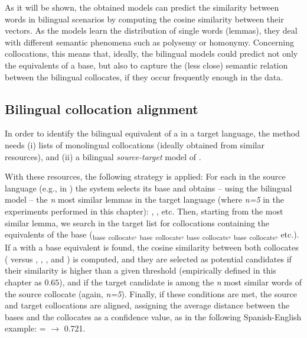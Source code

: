 \documentclass[output=paper
,modfonts
,nonflat]{langsci/langscibook}
\begin{document}
As it will be shown, the obtained models can predict the similarity between words
in bilingual scenarios by computing the cosine similarity between their vectors. As
the models learn the distribution of single words (lemmas), they deal with different
semantic phenomena such as polysemy or homonymy. Concerning collocations, this means
that, ideally, the bilingual models could predict not only the equivalents of a
base, but also to capture the (less close) semantic relation between the
bilingual collocates, if they occur frequently enough in the data.

%
\subsection{Bilingual collocation alignment}
\label{garcia:sec:align}
In order to identify the bilingual equivalent of a  in a target language,
the method needs (i) lists of monolingual collocations (ideally obtained from similar
resources), and (ii) a bilingual \emph{source-target} model of .

With these resources, the following strategy is applied: For each 
in the source language (e.g.,  in ) the system selects its base and obtains -- using the bilingual model --
the \emph{n} most similar lemmas in the target language (where \emph{n=5} in the experiments
performed in this chapter): , , etc. Then, starting from the most similar lemma,
we search in the target list for collocations containing the equivalents of
the base (\textsubscript{base} \textsubscript{collocate},
\textsubscript{base} \textsubscript{collocate}, \textsubscript{base} \textsubscript{collocate}, \textsubscript{base} \textsubscript{collocate}, etc.). If a  with
a base equivalent is found, the cosine similarity between both collocates
( versus , , , and ) is computed, and
they are selected as potential candidates if their similarity is higher than a given threshold
(empirically defined in this chapter as $0.65$), and if the target candidate is among the \emph{n}
most similar words of the source collocate (again, \emph{n=5}). Finally, if these conditions
are met, the source and target collocations are aligned, assigning the average distance between the
bases and the collocates as a confidence value, as in the following Spanish-English example:
 =  $\rightarrow$ 0.721.
\end{document}
